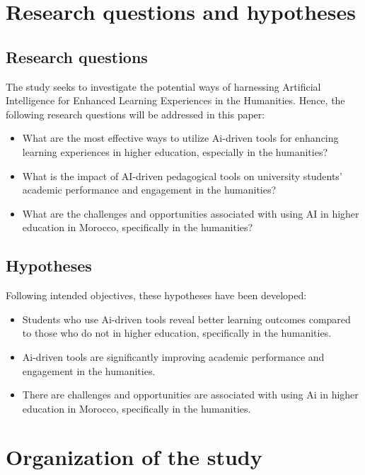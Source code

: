 \section{Research questions and hypotheses}\label{sec:research-questions-and-hypotheses}

\subsection{Research questions}\label{subsec:research-questions}
\justifying
The study seeks to investigate the potential ways
of harnessing Artificial Intelligence for
Enhanced Learning Experiences in the Humanities.
Hence,
the following research questions will be addressed in this paper:
\begin{itemize}
    \item What are the most effective ways to utilize Ai-driven
    tools for enhancing learning experiences in higher education, 
    especially in the humanities?
    \item What is the impact of AI-driven pedagogical tools 
    on university students' academic performance 
    and engagement in the humanities?
    \item What are the challenges and opportunities associated 
    with using AI in higher education in Morocco, 
    specifically in the humanities?
\end{itemize}
\subsection{Hypotheses}\label{subsec:hypotheses}
\justifying
Following intended objectives, these hypotheses have been developed:
\begin{itemize}
    \item Students who use Ai-driven tools reveal better learning outcomes
    compared to those who do not in higher education, specifically in the humanities.
    \item Ai-driven tools are significantly improving academic
    performance and engagement in the humanities.
    \item There are challenges and opportunities are associated with using Ai in higher
    education in Morocco, specifically in the humanities.
\end{itemize}


\section{Organization of the study}\label{sec:organization-of-the-study}
\justifying
\lipsum[1]

